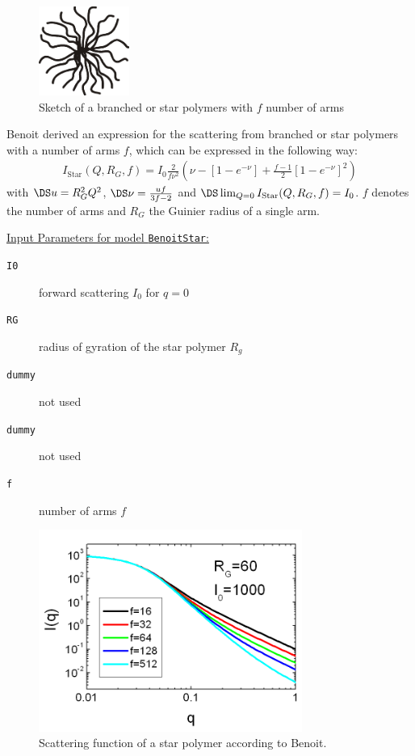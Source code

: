 \begin{figure}[htb]
\begin{center}
\includegraphics[width=0.2635\textwidth,height=0.2595\textwidth]{Benoit.png}
\end{center}
\caption{Sketch of a branched or star
polymers with $f$ number of arms} \label{fig:BenoitStar}
\end{figure}

Benoit \cite{Benoit53} derived an expression for the scattering from branched or star
polymers with a number of arms $f$, which can be expressed in the following way:
\begin{align}
I_\text{Star}(Q,R_G,f)= I_0 \frac{2}{f\nu^2}
    \left( \nu-\left[1-e^{-\nu}\right]+\frac{f-1}{2}\left[1-e^{-\nu}\right]^2\right)
\end{align}
with $\DS u=R_G^2Q^2$, $\DS \nu=\frac{uf}{3f-2}$ and $\DS
\lim_{Q=0}I_\text{Star}(Q,R_G,f)=I_0$. $f$
denotes the number of arms and $R_G$ the Guinier radius of a
single arm.

\vspace{5mm}

\noindent
\uline{Input Parameters for model \texttt{BenoitStar}:}
\begin{description}
\item[\texttt{I0}] forward scattering $I_0$ for $q=0$
\item[\texttt{RG}] radius of gyration of the star polymer $R_g$
\item[\texttt{dummy}] not used
\item[\texttt{dummy}] not used
\item[\texttt{f}] number of arms $f$
\end{description}


\begin{figure}[htb]
\begin{center}
\includegraphics[width=0.768\textwidth,height=0.588\textwidth]{Benoit_Iq.png}
\end{center}
\caption{Scattering function of a star polymer according to Benoit. } \label{fig:Benoit_Iq}
\end{figure}

